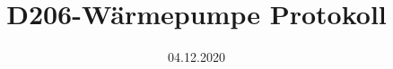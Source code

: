 

\author{}
\title{D206-Wärmepumpe Protokoll}
\date{04.12.2020}



\begin{minipage}{\textwidth}
\maketitle
\tableofcontents
\end{minipage}
\ignorespacesafterend
\newpage






